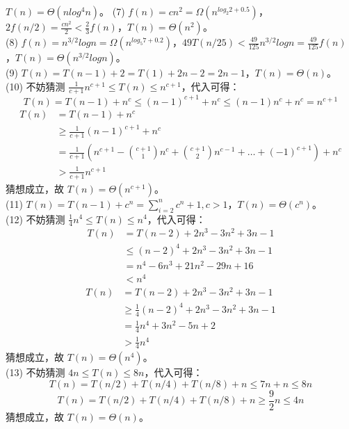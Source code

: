 \documentclass[12pt, a4paper, oneside]{ctexart}
\begin{document}
\begin{solution}[2.16]
$T(n) = \Theta(nlog^4 n)$。
\newpage
(7) $f(n) = cn^2 = \Omega(n^{log_2 2 + 0.5})$，$2f(n / 2) = \frac{cn^2}{2} < \frac{2}{3} f(n)$，$T(n) = \Theta(n^2)$。
\\(8) $f(n) = n^{3 / 2}logn = \Omega(n^{log_5 7 + 0.2})$，$49T(n / 25) < \frac{49}{125} n^{3 / 2} logn = \frac{49}{125} f(n)$，$T(n) = \Theta(n^{3 / 2} logn)$。
\\(9) $T(n) = T(n - 1) + 2 = T(1) + 2n - 2 = 2n - 1$，$T(n) = \Theta(n)$。
\\(10) 不妨猜测 $\frac{1}{c + 1} n^{c + 1} \leq T(n) \leq n^{c + 1}$，代入可得：
\[
    T(n) = T(n - 1) + n^c \leq (n - 1)^{c + 1} + n^c \leq (n - 1) n^c + n^c = n^{c + 1}
\]
\begin{align*}
    T(n) &= T(n - 1) + n^c \\
    &\geq \frac{1}{c + 1} (n - 1)^{c + 1} + n^c \\
    &= \frac{1}{c + 1} (n^{c + 1} - \binom{c + 1}{1} n^c + \binom{c + 1}{2} n^{c - 1} + \dots + (-1)^{c + 1}) + n^c \\
    &> \frac{1}{c + 1} n^{c + 1}
\end{align*}
猜想成立，故 $T(n) = \Theta(n^{c + 1})$。
\\(11) $T(n) = T(n - 1) + c^n = \sum_{i = 2}^{n} c^n + 1, c > 1$，$T(n) = \Theta(c^n)$。
\\(12) 不妨猜测 $\frac{1}{4} n^4 \leq T(n) \leq n^4$，代入可得：
\begin{align*}
    T(n) &= T(n - 2) + 2n^3 - 3n^2 + 3n - 1 \\
    &\leq (n - 2)^4 + 2n^3 - 3n^2 + 3n - 1 \\
    &= n^4 - 6n^3 + 21n^2 - 29n + 16 \\
    &< n^4
\end{align*}
\begin{align*}
    T(n) &= T(n - 2) + 2n^3 - 3n^2 + 3n - 1 \\
    &\geq \frac{1}{4} (n - 2)^4 + 2n^3 - 3n^2 + 3n - 1 \\
    &= \frac{1}{4} n^4 + 3n^2 - 5n + 2 \\
    &> \frac{1}{4} n^4
\end{align*}
猜想成立，故 $T(n) = \Theta(n^4)$。
\\(13) 不妨猜测 $4n \leq T(n) \leq 8n$，代入可得：
\[
    T(n) = T(n / 2) + T(n / 4) + T(n / 8) + n \leq 7n + n \leq 8n
\]
\[
    T(n) = T(n / 2) + T(n / 4) + T(n / 8) + n \geq \frac{9}{2} n \leq 4n
\]
猜想成立，故 $T(n) = \Theta(n)$。
\end{solution}
\end{document}
